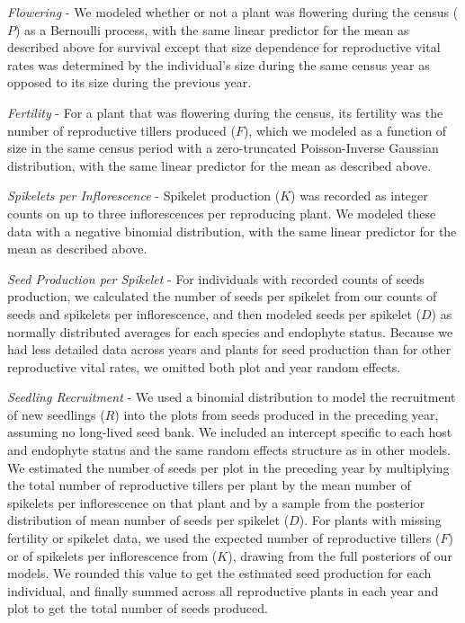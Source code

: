 \documentclass[9pt,twocolumn,twoside]{pnas-new}
\begin{document}
{\emph{Flowering} - We modeled whether or not a plant was flowering during the census ($P$) as a Bernoulli process, with the same linear predictor for the mean as described above for survival except that size dependence for reproductive vital rates was determined by the individual's size during the same census year as opposed to its size during the previous year.

\emph{Fertility} - For a plant that was flowering during the census, its fertility was the number of reproductive tillers produced ($F$), which we modeled as a function of size in the same census period with a zero-truncated Poisson-Inverse Gaussian distribution, with the same linear predictor for the mean as described above. 

\emph{Spikelets per Inflorescence} - Spikelet production ($K$) was recorded as integer counts on up to three inflorescences per reproducing plant.
We modeled these data with a negative binomial distribution, with the same linear predictor for the mean as described above. 

\emph{Seed Production per Spikelet} - For individuals with recorded counts of seeds production, we calculated the number of seeds per spikelet from our counts of seeds and spikelets per inflorescence, and then modeled seeds per spikelet ($D$) as normally distributed averages for each species and endophyte status. 
Because we had less detailed data across years and plants for seed production than for other reproductive vital rates, we omitted both plot and year random effects. 

\emph{Seedling Recruitment} - We used a binomial distribution to model the recruitment of new seedlings ($R$) into the plots from seeds produced in the preceding year, assuming no long-lived seed bank. 
We included an intercept specific to each host and endophyte status and the same random effects structure as in other models. 
We estimated the number of seeds per plot in the preceding year by multiplying the total number of reproductive tillers per plant by the mean number of spikelets per inflorescence on that plant and by a sample from the posterior distribution of mean number of seeds per spikelet ($D$).
For plants with missing fertility or spikelet data, we used the expected number of reproductive tillers ($F$) or of spikelets per inflorescence from ($K$), drawing from the full posteriors of our models. 
We rounded this value to get the estimated seed production for each individual, and finally summed across all reproductive plants in each year and plot to get the total number of seeds produced. 

}
\end{document}
